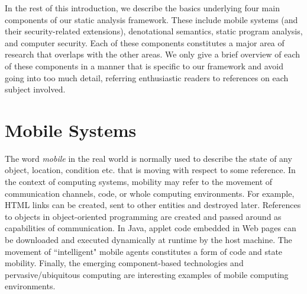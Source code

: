 \documentclass[10pt,a4paper,final,oneside,fleqn]{book}
\begin{document}
In the rest of this introduction, we describe the basics underlying four main components of our static analysis framework.  These include mobile systems (and their security-related extensions), denotational semantics, static program analysis, and computer security.  Each of these components constitutes a major area of research that overlaps with the other areas.  We only give a brief overview of each of these components in a manner that is specific to our framework and avoid going into too much detail, referring enthusiastic readers to references on each subject involved.
\section{Mobile Systems}
The word {\itshape mobile\/} in the real world is normally used to describe the state of any object, location, condition etc. that is moving with respect to some reference.  In the context of computing systems, mobility may refer to the movement of communication channels, code, or whole computing environments.  For example, HTML links can be created, sent to other entities and destroyed later.  References to objects in object-oriented programming are created and passed around as capabilities of communication.  In Java, applet code embedded in Web pages can be downloaded and executed dynamically at runtime by the host machine.  The movement of ``intelligent" mobile agents constitutes a form of code and state mobility.  Finally, the emerging component-based technologies and pervasive/ubiquitous computing are interesting examples of mobile computing environments.
\end{document}
